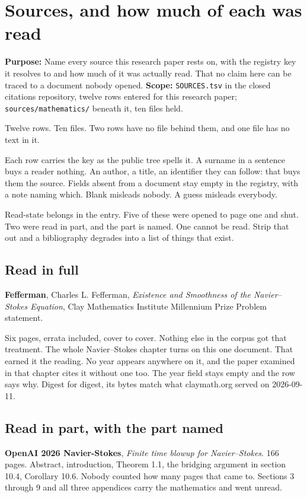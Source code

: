 \chapter{Sources, and how much of each was read}

\textbf{Purpose:} Name every source this research paper rests on, with the registry key it resolves to and
how much of it was actually read. That no claim here can be traced to a document nobody opened.
\textbf{Scope:} \texttt{SOURCES.\allowbreak{}tsv} in the closed citations repository, twelve rows
entered for this research paper; \texttt{sources/\allowbreak{}mathematics/\allowbreak{}} beneath it, ten
files held.

Twelve rows. Ten files. Two rows have no file behind them, and one file has no text in it.

Each row carries the key as the public tree spells it. A surname in a sentence buys a reader
nothing. An author, a title, an identifier they can follow: that buys them the source. Fields absent
from a document stay empty in the registry, with a note naming which. Blank misleads nobody. A
guess misleads everybody.

Read-state belongs in the entry. Five of these were opened to page one and shut. Two were read in
part, and the part is named. One cannot be read. Strip that out and a bibliography degrades into a
list of things that exist.

\section{Read in full}

\textbf{Fefferman}, Charles L. Fefferman, \emph{Existence and Smoothness of the Navier--Stokes
Equation}, Clay Mathematics Institute Millennium Prize Problem statement.

Six pages, errata included, cover to cover. Nothing else in the corpus got that treatment. The
whole Navier--Stokes chapter turns on this one document. That earned it the reading. No year appears
anywhere on it, and the paper examined in that chapter cites it without one too. The year field
stays empty and the row says why. Digest for digest, its bytes match what claymath.org served on
2026-09-11.

\section{Read in part, with the part named}

\textbf{OpenAI 2026 Navier-Stokes}, \emph{Finite time blowup for Navier--Stokes}. 166 pages.
Abstract, introduction, Theorem 1.1, the bridging argument in section 10.4, Corollary 10.6. Nobody
counted how many pages that came to. Sections 3 through 9 and all three appendices carry the
mathematics and went unread.

